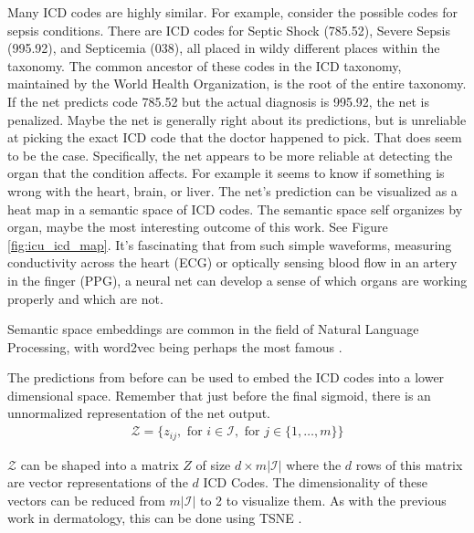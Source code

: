 Many ICD codes are highly similar.  For example, consider the possible codes for sepsis conditions.  There are ICD codes for Septic Shock (785.52), Severe Sepsis (995.92), and Septicemia (038), all placed in wildy different places within the taxonomy.  The common ancestor of these codes in the ICD taxonomy, maintained by the World Health Organization, is the root of the entire taxonomy.  If the net predicts code 785.52 but the actual diagnosis is 995.92, the net is penalized.  Maybe the net is generally right about its predictions, but is unreliable at picking the exact ICD code that the doctor happened to pick.  That does seem to be the case.  Specifically, the net appears to be more reliable at detecting the organ that the condition affects.  For example it seems to know if something is wrong with the heart, brain, or liver.  The net's prediction can be visualized as a heat map in a semantic space of ICD codes.  The semantic space self organizes by organ, maybe the most interesting outcome of this work.  See Figure \ref{fig:icu_icd_map}.  It's fascinating that from such simple waveforms, measuring conductivity across the heart (ECG) or optically sensing blood flow in an artery in the finger (PPG), a neural net can develop a sense of which organs are working properly and which are not.

Semantic space embeddings are common in the field of Natural Language Processing, with word2vec being perhaps the most famous \cite{mikolov2013efficient}.

The predictions from before can be used to embed the ICD codes into a lower dimensional space. Remember that just before the final sigmoid, there is an unnormalized representation of the net output.
\begin{gather}
    \mathcal{Z} = \{
        z_{ij},
        \text{ for } i \in \mathcal{I},
        \text{ for } j \in \{ 1, \dots, m \}
    \}
\end{gather}

$\mathcal{Z}$ can be shaped into a matrix $Z$ of size $d \times m |\mathcal{I}|$ where the $d$ rows of this matrix are vector representations of the $d$ ICD Codes.  The dimensionality of these vectors can be reduced from $m |\mathcal{I}|$ to 2 to visualize them.  As with the previous work in dermatology, this can be done using TSNE \cite{van2008visualizing}.

